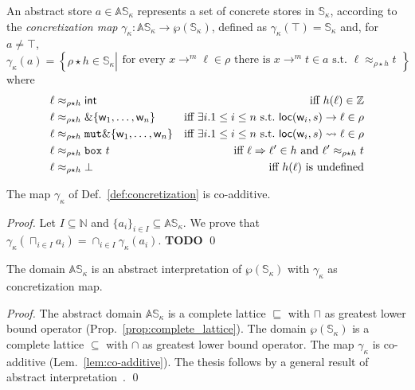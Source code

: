 \begin{definition}\label{def:concretization}
  An abstract store $a\in\mathbb{AS}_\kappa$ represents a set of concrete stores
  in $\mathbb{S}_\kappa$, according to the \emph{concretization map}
  $\gamma_\kappa:\mathbb{AS}_\kappa\to\wp(\mathbb{S}_\kappa)$, defined as
  $\gamma_\kappa(\top)=\mathbb{S}_\kappa$ and, for $a\not=\top$,
  \[
  \gamma_\kappa(a)=\left\{\rho\star h\in\mathbb{S}_\kappa\left|\begin{array}{l}
  \text{for every }x\to^m\ell\in\rho\text{ there is }x\to^m t\in a\text{ s.t.\ }\ell\approx_{\rho\star h}t
  \end{array}
  \right.\right\}
  \]
  where
  \begin{align*}
    \ell&\approx_{\rho\star h}\mathsf{int} & \text{iff $h(\ell)\in\mathbb{Z}$}\\
    \ell&\approx_{\rho\star h}\borrow\{\mathsf{w}_1,\ldots,\mathsf{w}_n\} & \text{iff $\exists i.1\le i\le n$ s.t.\ }\loc(\mathsf{w}_i,s)\to\ell\in\rho\\
    \ell&\approx_{\rho\star h}\mathtt{mut}\borrow\{\mathsf{w}_1,\ldots,\mathsf{w}_n\} & \text{iff $\exists i.1\le i\le n$ s.t.\ }\loc(\mathsf{w}_i,s)\leadsto\ell\in\rho\\
    \ell&\approx_{\rho\star h}\mathtt{box}\ t & \text{iff $\ell\Rightarrow\ell'\in h$ and $\ell'\approx_{\rho\star h}t$}\\
    \ell&\approx_{\rho\star h}\bot & \text{iff $h(\ell)$ is undefined}
  \end{align*}
\end{definition}

\begin{lemma}\label{lem:co-additive}
  The map $\gamma_\kappa$ of Def.~\ref{def:concretization} is co-additive.
\end{lemma}
\begin{proof}
  Let $I\subseteq\mathbb{N}$ and $\{a_i\}_{i\in I}\subseteq\mathbb{AS}_\kappa$. We prove that
  $\gamma_\kappa(\sqcap_{i\in I}a_i)=\cap_{i\in I}\gamma_\kappa(a_i)$.
  \textbf{TODO}
  \qed
\end{proof}

\begin{proposition}\label{prop:abstract_interpretation}
  The domain $\mathbb{AS}_\kappa$ is an abstract interpretation of $\wp(\mathbb{S}_\kappa)$
  with $\gamma_\kappa$ as concretization map.
\end{proposition}
\begin{proof}
  The abstract domain $\mathbb{AS}_\kappa$ is a complete lattice \wrt $\sqsubseteq$
  with $\sqcap$ as greatest lower bound operator (Prop.~\ref{prop:complete_lattice}).
  The domain $\wp(\mathbb{S}_\kappa)$ is a complete lattice \wrt $\subseteq$ with $\cap$ as
  greatest lower bound operator. The map $\gamma_\kappa$ is co-additive (Lem.~\ref{lem:co-additive}).
  The thesis follows by a general result of abstract interpretation~\cite{CousotC77}.
  \qed
\end{proof}
